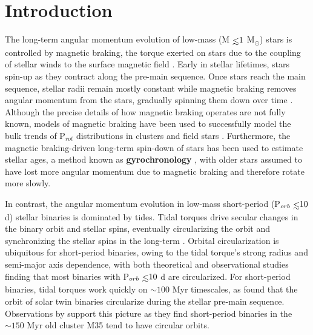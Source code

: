 \documentclass[twocolumn]{aastex61}
\def\lsim{~\rlap{$<$}{\lower 1.0ex\hbox{$\sim$}}}
\newcommand{\xxx}[1]{{\textbf{#1}}}
\newcommand{\kepler}[0]{\textit{Kepler}\xspace}
\begin{document}



\section{Introduction} \label{sec:intro}

The long-term angular momentum evolution of low-mass (M$\lsim 1$ M$_{\odot}$) stars is controlled by magnetic braking, the torque exerted on stars due to the coupling of stellar winds to the surface magnetic field \citep{Mestel1968}. Early in stellar lifetimes, stars spin-up as they contract along the pre-main sequence.  Once stars reach the main sequence, stellar radii remain mostly constant while magnetic braking removes angular momentum from the stars, gradually spinning them down over time \citep{Skumanich1972}. Although the precise details of how magnetic braking operates are not fully known, models of magnetic braking have been used to successfully model the bulk trends of P$_{rot}$ distributions in clusters \textbf{\citep[e.g. Praesepe, ][]{Reiners2012,Matt2015,Douglas2017}} and field stars \citep[e.g. the \kepler field, ][]{Matt2015,vanSaders2018}. Furthermore, the magnetic braking-driven long-term spin-down of stars has been used to estimate stellar ages, a method known as \xxx{gyrochronology} \citep{Skumanich1972,Barnes2003,Barnes2007,Mamajek2008,Barnes2010}, with older stars assumed to have lost more angular momentum due to magnetic braking and therefore rotate more slowly.

In contrast, the angular momentum evolution in low-mass short-period (P$_{orb} \lsim 10$ d) stellar binaries is dominated by tides.  Tidal torques drive secular changes in the binary orbit and stellar spins, eventually circularizing the orbit and synchronizing the stellar spins in the long-term \citep{Counselman1973}. Orbital circularization is ubiquitous for short-period binaries, owing to the tidal torque's strong radius and semi-major axis dependence, with both theoretical \citep[e.g.][]{Zahn1989,Claret1995} and observational \citep[e.g.][]{Meibom2005,Mazeh2008,Lurie2017} studies finding that most binaries with P$_{orb} \lsim 10$ d are circularized. For short-period binaries, tidal torques work quickly on ${\sim}100$ Myr timescales, as \citet{Zahn1989} found that the orbit of solar twin binaries circularize during the stellar pre-main sequence.  Observations by \citet{Meibom2005} support this picture as they find short-period binaries in the ${\sim}150$ Myr old cluster M35 tend to have circular orbits.
\end{document}
